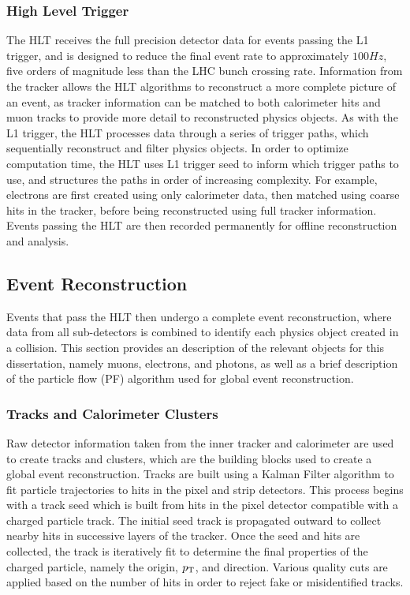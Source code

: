 \subsubsection{High Level Trigger} \label{sec:CMS_HLT}
The HLT receives the full precision detector data for events passing the L1 trigger, and is designed to reduce the final event rate to approximately $100\unit{Hz}$, five orders of magnitude less than the LHC bunch crossing rate. Information from the tracker allows the HLT algorithms to reconstruct a more complete picture of an event, as tracker information can be matched to both calorimeter hits and muon tracks to provide more detail to reconstructed physics objects. As with the L1 trigger, the HLT processes data through a series of trigger paths, which sequentially reconstruct and filter physics objects. In order to optimize computation time, the HLT uses L1 trigger seed to inform which trigger paths to use, and structures the paths in order of increasing complexity. For example, electrons are first created using only calorimeter data, then matched using coarse hits in the tracker, before being reconstructed using full tracker information. Events passing the HLT are then recorded permanently for offline reconstruction and analysis. 

\subsection{Event Reconstruction} \label{sec:CMS_Reco}
Events that pass the HLT then undergo a complete event reconstruction, where data from all sub-detectors is combined to identify each physics object created in a collision. This section provides an description of the relevant objects for this dissertation, namely muons, electrons, and photons, as well as a brief description of the particle flow (PF) algorithm used for global event reconstruction.

\subsubsection{Tracks and Calorimeter Clusters} \label{sec:CMS_trk_clusters}
Raw detector information taken from the inner tracker and calorimeter are used to create tracks and clusters, which are the building blocks used to create a global event reconstruction. Tracks are built using a Kalman Filter algorithm to fit particle trajectories to hits in the pixel and strip detectors. This process begins with a track seed which is built from hits in the pixel detector compatible with a charged particle track. The initial seed track is propagated outward to collect nearby hits in successive layers of the tracker. Once the seed and hits are collected, the track is iteratively fit to determine the final properties of the charged particle, namely the origin, $p_\mathrm{T}$, and direction. Various quality cuts are applied based on the number of hits in order to reject fake or misidentified tracks.

